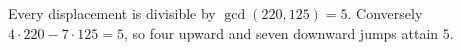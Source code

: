 Every displacement is divisible by $\gcd(220,125)=5$. Conversely $4\cdot220-7\cdot125=5$, so four upward and seven downward jumps attain $\boxed5$.
